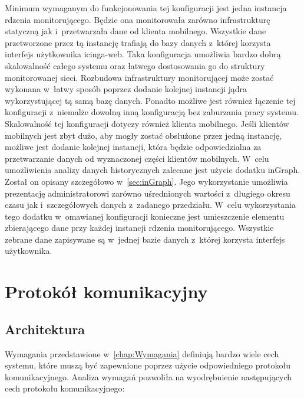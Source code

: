 Minimum wymaganym do funkcjonowania tej konfiguracji jest jedna
instancja rdzenia monitorującego. Będzie ona monitorowała zarówno
infrastrukturę statyczną jak i~przetwarzała dane od klienta
mobilnego. Wszystkie dane przetworzone przez tą instancję trafiają do
bazy danych z~której korzysta interfejs użytkownika icinga-web. Taka
konfiguracja umożliwia bardzo dobrą skalowalność całego systemu oraz
łatwego dostosowania go do struktury monitorowanej sieci. Rozbudowa
infrastruktury monitorującej może zostać wykonana w~łatwy sposób
poprzez dodanie kolejnej instancji jądra wykorzystującej tą samą bazę
danych. Ponadto możliwe jest również łączenie tej konfiguracji
z~niemalże dowolną inną konfiguracją bez zaburzania pracy
systemu. Skalowalność tej konfiguracji dotyczy również klienta
mobilnego. Jeśli klientów mobilnych jest zbyt dużo, aby mogły zostać
obsłużone przez jedną instancję, możliwe jest dodanie kolejnej
instancji, która będzie odpowiedzialna za przetwarzanie danych od
wyznaczonej części klientów mobilnych. W~celu umożliwienia analizy
danych historycznych zalecane jest użycie dodatku inGraph. Został on
opisany szczegółowo w~\ref{sec:inGraph}. Jego wykorzystanie umożliwia
prezentację administratorowi zarówno uśrednionych wartości z~długiego
okresu czasu jak i~szczegółowych danych z~zadanego przedziału. W~celu
wykorzystania tego dodatku w~omawianej konfiguracji konieczne jest
umieszczenie elementu zbierającego dane przy każdej instancji rdzenia
monitorującego. Wszystkie zebrane dane zapisywane są w~jednej bazie
danych z~której korzysta interfejs użytkownika.



\section[Protokół komunikacyjny][Protokół komunikacyjny]{Protokół komunikacyjny}
\label{sec:ProtKom}
\subsection[Architektura][Architektura]{Architektura}

Wymagania przedstawione w~\ref{chap:Wymagania} definiują bardzo wiele
cech systemu, które muszą być zapewnione poprzez użycie odpowiedniego
protokołu komunikacyjnego. Analiza wymagań pozwoliła na wyodrębnienie
następujących cech protokołu komunikacyjnego:

